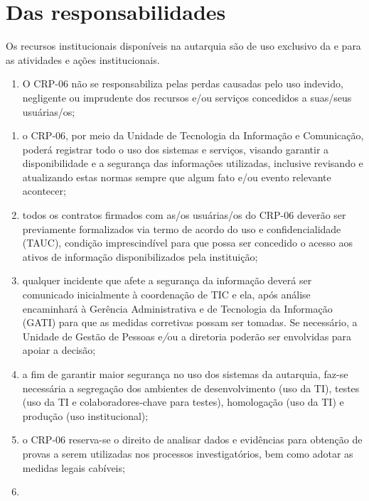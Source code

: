 \section{Das responsabilidades}

Os recursos institucionais disponíveis na autarquia são de uso exclusivo
da e para as atividades e ações institucionais.

\begin{enumerate}

\item
    O CRP-06 não se responsabiliza pelas perdas causadas pelo uso
    indevido, negligente ou imprudente dos recursos e/ou serviços
    concedidos a suas/seus usuárias/os;
\end{enumerate}

\begin{enumerate}
\item
    o CRP-06, por meio da Unidade de Tecnologia da Informação e
    Comunicação, poderá registrar todo o uso dos sistemas e serviços,
    visando garantir a disponibilidade e a segurança das informações
    utilizadas, inclusive revisando e atualizando estas normas sempre que
    algum fato e/ou evento relevante acontecer;
\item
    todos os contratos firmados com as/os usuárias/os do CRP-06 deverão
    ser previamente formalizados via termo de acordo do uso e
    confidencialidade (TAUC), condição imprescindível para que possa ser
    concedido o acesso aos ativos de informação disponibilizados pela
    instituição;
\item
    qualquer incidente que afete a segurança da informação deverá ser
    comunicado inicialmente à coordenação de TIC e ela, após análise
    encaminhará à Gerência Administrativa e de Tecnologia da Informação
    (GATI) para que as medidas corretivas possam ser tomadas. Se
    necessário, a Unidade de Gestão de Pessoas e\emph{/}ou a diretoria
    poderão ser envolvidas para apoiar a decisão;
\item
    a fim de garantir maior segurança no uso dos sistemas da autarquia,
    faz-se necessária a segregação dos ambientes de desenvolvimento (uso
    da TI), testes (uso da TI e colaboradores-chave para testes),
    homologação (uso da TI) e produção (uso institucional);
\item
    o CRP-06 reserva-se o direito de analisar dados e evidências para
    obtenção de provas a serem utilizadas nos processos investigatórios,
    bem como adotar as medidas legais cabíveis;
\item

\end{enumerate}
